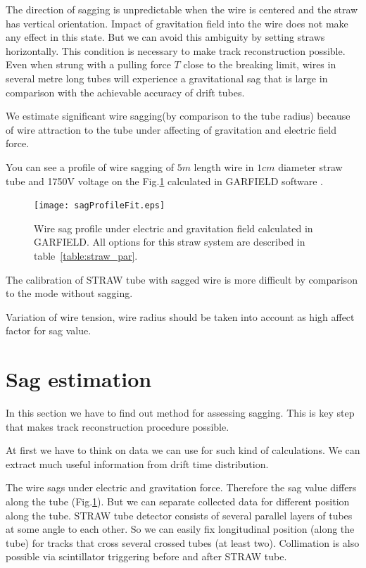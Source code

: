 	The direction of sagging is unpredictable when the wire is centered and the straw has vertical orientation. Impact of gravitation field into the wire does not make any effect in this state. But we can avoid this ambiguity by setting straws horizontally. This condition is necessary to make track reconstruction possible.
	Even when strung with a pulling force $T$ close to the breaking limit, wires in several metre long tubes will experience a gravitational sag that is large in comparison with the achievable accuracy of drift tubes.
	
	
	We estimate significant wire sagging(by comparison to the tube radius) because of wire attraction to the tube under affecting of gravitation and electric field force.
	
	You can see a profile of wire sagging of $5m$ length wire in $1cm$ diameter straw tube and 1750V voltage on the Fig.\ref{fig:sagProfile} calculated in GARFIELD software \cite{garfield}.
	
	\begin{figure}[h!]
	\centering
	\texttt{[image: sagProfileFit.eps]}
	\caption{Wire sag profile under electric and gravitation field calculated in GARFIELD. All options for this straw system are described in table~\ref{table:straw_par}.}
	\label{fig:sagProfile}
	\end{figure}	
	
	The calibration of STRAW tube with sagged wire is more difficult by comparison to the mode without sagging. 
	
	Variation of wire tension, wire radius should be taken into account as high affect factor for sag value.
	
	\section{Sag estimation}
	\label{sec:sagEstimation}
	In this section we have to find out method for assessing sagging. This is key step that makes track reconstruction procedure possible.
	
	At first we have to think on data we can use for such kind of calculations. We can extract much useful information  from drift time distribution.
	
	The wire sags under electric and gravitation force. Therefore the sag value differs along the tube (Fig.\ref{fig:sagProfile}). But we can separate collected data for different position along the tube. STRAW tube detector consists of several parallel layers of tubes at some angle to each other. So we can easily fix longitudinal position (along the tube) for tracks that cross several crossed tubes (at least two). Collimation is also possible via scintillator triggering before and after STRAW tube.
	

